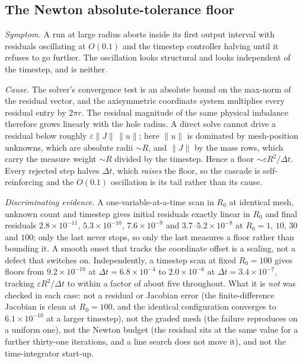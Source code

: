 \documentclass[11pt,a4paper]{article}
\begin{document}
\subsection{The Newton absolute-tolerance floor}
\label{sec:trap-newton}

\emph{Symptom.} A run at large radius aborts inside its first output interval
with residuals oscillating at $O(0.1)$ and the timestep controller halving until
it refuses to go further. The oscillation looks structural and looks independent
of the timestep, and is neither.

\emph{Cause.} The solver's convergence test is an absolute bound on the
max-norm of the residual vector, and the axisymmetric coordinate system
multiplies every residual entry by $2\pi r$. The residual magnitude of the same
physical imbalance therefore grows linearly with the hole radius. A direct solve
cannot drive a residual below roughly $\varepsilon\|J\|\,\|u\|$; here $\|u\|$ is
dominated by mesh-position unknowns, which are absolute radii $\sim R$, and
$\|J\|$ by the mass rows, which carry the measure weight $\sim R$ divided by the
timestep. Hence a floor $\sim \varepsilon R^{2}/\Delta t$. Every rejected step
halves $\Delta t$, which \emph{raises} the floor, so the cascade is
self-reinforcing and the $O(0.1)$ oscillation is its tail rather than its cause.

\emph{Discriminating evidence.} A one-variable-at-a-time scan in $R_{0}$ at
identical mesh, unknown count and timestep gives initial residuals exactly
linear in $R_{0}$ and final residuals $2.8\times10^{-11}$, $5.3\times10^{-10}$,
$7.6\times10^{-9}$ and $3.7$--$5.2\times10^{-8}$ at $R_{0}=1$, $10$, $30$ and
$100$; only the last never stops, so only the last measures a floor rather than
bounding it. A smooth onset that tracks the coordinate offset is a scaling, not
a defect that switches on. Independently, a timestep scan at fixed $R_{0}=100$
gives floors from $9.2\times10^{-10}$ at $\Delta t = 6.8\times10^{-4}$ to
$2.0\times10^{-6}$ at $\Delta t = 3.4\times10^{-7}$, tracking
$\varepsilon R^{2}/\Delta t$ to within a factor of about five throughout. What
it is \emph{not} was checked in each case: not a residual or Jacobian error (the
finite-difference Jacobian is clean at $R_{0}=100$, and the identical
configuration converges to $6.1\times10^{-10}$ at a larger timestep), not the
graded mesh (the failure reproduces on a uniform one), not the Newton budget
(the residual sits at the same value for a further thirty-one iterations, and a
line search does not move it), and not the time-integrator start-up.
\end{document}
